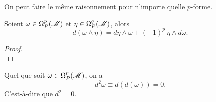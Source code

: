 \documentclass[a4paper,11pt]{report}
\begin{document}
\begin{exmp}
\begin{itemize}[label = \textbullet]
                        On peut faire le même raisonnement pour n'importe quelle $p$-forme.
                \end{itemize}
            \end{exmp}
            
            \begin{prop}\begin{leftbar}
                Soient $\omega\in\Omega_P^p(\mathscr{M})$ et $\eta\in\Omega_P^q(\mathscr{M})$, alors
                \begin{equation}
                    d(\omega\wedge\eta) = d\eta\wedge\omega+(-1)^{p}~\eta\wedge d\omega.
                \end{equation}
            \end{leftbar}\end{prop}
            
            \begin{proof}${}$\\
                \comp
            \end{proof}
            
            \begin{prop}\begin{leftbar}
                Quel que soit $\omega\in\Omega_P^p(\mathscr{M})$, on a 
                \begin{equation}
                    d^2\omega \equiv d(d(\omega)) = 0.
                \end{equation}
                C'est-à-dire que $d^2 = 0$.
            \end{leftbar}\end{prop}
            
\end{document}
